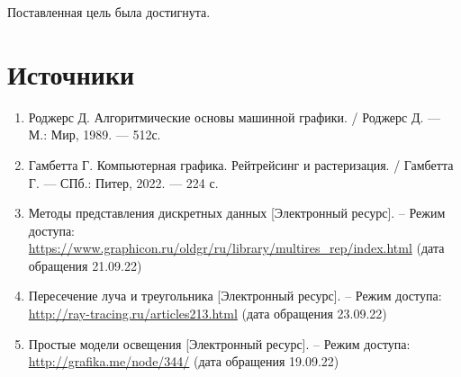 \documentclass[12pt,a4paper,oneside]{report}
\begin{document}
    	Поставленная цель была достигнута.
    \chapter{Источники}
    	\begin{enumerate}
    		\item Роджерс Д. Алгоритмические основы машинной графики. / Роджерс Д. — М.: Мир, 1989. — 512с.
    		\item Гамбетта Г. Компьютерная графика. Рейтрейсинг и растеризация. / Гамбетта Г. — СПб.: Питер, 2022. —
224 с.
    		\item Методы представления дискретных данных [Электронный ресурс]. – Режим доступа: \url{https://www.graphicon.ru/oldgr/ru/library/multires_rep/index.html} (дата обращения 21.09.22)
    		\item Пересечение луча и треугольника [Электронный ресурс]. – Режим доступа: \url{http://ray-tracing.ru/articles213.html} (дата обращения 23.09.22)
    		\item Простые модели освещения [Электронный ресурс]. – Режим доступа: \url{http://grafika.me/node/344/} (дата обращения 19.09.22)
    	\end{enumerate}
\end{document}
